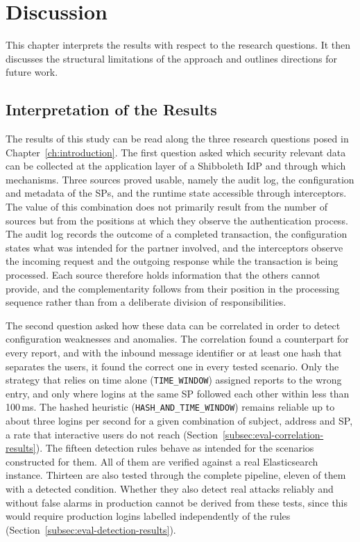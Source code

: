 \documentclass[../main.tex]{subfiles}
\begin{document}
\chapter{Discussion}\label{ch:discussion}

This chapter interprets the results with respect to the research questions. 
It then discusses the structural limitations of the approach and outlines directions for future work. 

\section{Interpretation of the Results}\label{sec:interpretation}

The results of this study can be read along the three research questions posed in 
Chapter~\ref{ch:introduction}. 
The first question asked which security relevant data can be collected at the application layer 
of a Shibboleth IdP and through which mechanisms. 
Three sources proved usable, namely the audit log, the configuration and metadata of the SPs, 
and the runtime state accessible through interceptors. 
The value of this combination does not primarily result from the number of sources but from the 
positions at which they observe the authentication process. 
The audit log records the outcome of a completed transaction, the configuration states what was 
intended for the partner involved, and the interceptors observe the incoming request and the 
outgoing response while the transaction is being processed. 
Each source therefore holds information that the others cannot provide, and the complementarity 
follows from their position in the processing sequence rather than from a deliberate division of 
responsibilities. 

The second question asked how these data can be correlated in order to detect configuration 
weaknesses and anomalies. 
The correlation found a counterpart for every report, and with the inbound message identifier or at 
least one hash that separates the users, it found the correct one in every tested scenario. 
Only the strategy that relies on time alone (\texttt{TIME\_\allowbreak{}WINDOW}) assigned reports to 
the wrong entry, and only where logins at the same SP followed each other within less than 100\,ms. 
The hashed heuristic (\texttt{HASH\_\allowbreak{}AND\_\allowbreak{}TIME\_\allowbreak{}WINDOW}) remains 
reliable up to about three logins per second for a given combination of subject, address and SP, a rate 
that interactive users do not reach (Section~\ref{subsec:eval-correlation-results}). 
The fifteen detection rules behave as intended for the scenarios constructed for them. 
All of them are verified against a real Elasticsearch instance. 
Thirteen are also tested through the complete pipeline, eleven of them with a detected condition. 
Whether they also detect real attacks reliably and without false alarms in production cannot be 
derived from these tests, since this would require production logins labelled independently of the 
rules (Section~\ref{subsec:eval-detection-results}).
\end{document}
